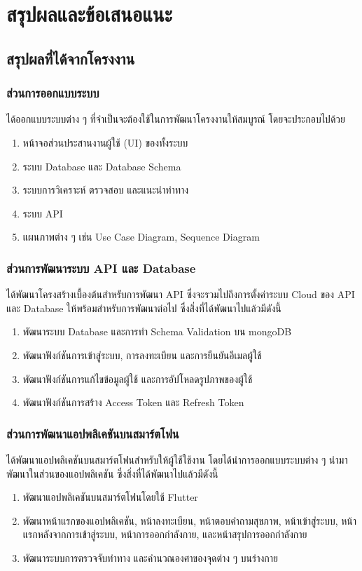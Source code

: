 \chapter{สรุปผลและข้อเสนอแนะ}
\section{สรุปผลที่ได้จากโครงงาน}
\subsection{ส่วนการออกแบบระบบ}
ได้ออกแบบระบบต่าง ๆ ที่จำเป็นจะต้องใช้ในการพัฒนาโครงงานให้สมบูรณ์ โดยจะประกอบไปด้วย
\begin{enumerate}
    \item หน้าจอส่วนประสานงานผู้ใช้ (UI) ของทั้งระบบ
    \item ระบบ Database และ Database Schema
    \item ระบบการวิเคราะห์ ตรวจสอบ และแนะนำท่าทาง
    \item ระบบ API
    \item แผนภาพต่าง ๆ เช่น Use Case Diagram, Sequence Diagram
\end{enumerate}

\subsection{ส่วนการพัฒนาระบบ API และ Database}
ได้พัฒนาโครงสร้างเบื้องต้นสำหรับการพัฒนา API ซึ่งจะรวมไปถึงการตั้งค่าระบบ Cloud ของ API และ Database ให้พร้อมสำหรับการพัฒนาต่อไป ซึ่งสิ่งที่ได้พัฒนาไปแล้วมีดังนี้
\begin{enumerate}
    \item พัฒนาระบบ Database และการทำ Schema Validation บน mongoDB
    \item พัฒนาฟังก์ชันการเข้าสู่ระบบ, การลงทะเบียน และการยืนยันอีเมลผู้ใช้
    \item พัฒนาฟังก์ชันการแก้ไขข้อมูลผู้ใช้ และการอัปโหลดรูปภาพของผู้ใช้
    \item พัฒนาฟังก์ชันการสร้าง Access Token และ Refresh Token
\end{enumerate}

\subsection{ส่วนการพัฒนาแอปพลิเคชันบนสมาร์ตโฟน}
ได้พัฒนาแอปพลิเคชันบนสมาร์ตโฟนสำหรับให้ผู้ใช้ใช้งาน โดยได้นำการออกแบบระบบต่าง ๆ นำมาพัฒนาในส่วนของแอปพลิเคชัน ซึ่งสิ่งที่ได้พัฒนาไปแล้วมีดังนี้
\begin{enumerate}
    \item พัฒนาแอปพลิเคชันบนสมาร์ตโฟนโดยใช้ Flutter
    \item พัฒนาหน้าแรกของแอปพลิเคชัน, หน้าลงทะเบียน, หน้าตอบคำถามสุขภาพ, หน้าเข้าสู่ระบบ, หน้าแรกหลังจากการเข้าสู่ระบบ, หน้าการออกกำลังกาย, และหน้าสรุปการออกกำลังกาย
    \item พัฒนาระบบการตรวจจับท่าทาง และคำนวณองศาของจุดต่าง ๆ บนร่างกาย
\end{enumerate}

